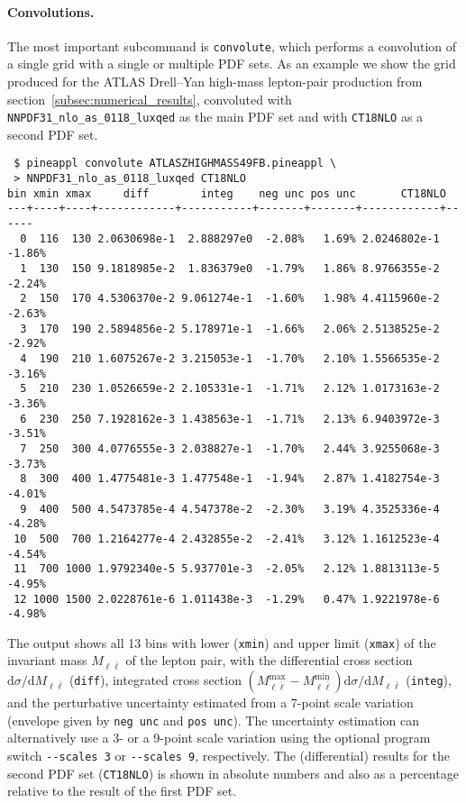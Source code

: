 \paragraph{Convolutions.}
The most important subcommand is \texttt{convolute}, which performs a convolution of a single grid with a single or multiple PDF sets.
As an example we show the grid produced for the ATLAS Drell--Yan high-mass lepton-pair production from section~\ref{subsec:numerical_results}, convoluted with \texttt{NNPDF31\_nlo\_as\_0118\_luxqed} as the main PDF set and with \texttt{CT18NLO} as a second PDF set.
\begin{verbatim}
 $ pineappl convolute ATLASZHIGHMASS49FB.pineappl \
 > NNPDF31_nlo_as_0118_luxqed CT18NLO
bin xmin xmax     diff        integ    neg unc pos unc       CT18NLO
---+----+----+------------+-----------+-------+-------+------------+------
  0  116  130 2.0630698e-1  2.888297e0  -2.08%   1.69% 2.0246802e-1 -1.86%
  1  130  150 9.1818985e-2  1.836379e0  -1.79%   1.86% 8.9766355e-2 -2.24%
  2  150  170 4.5306370e-2 9.061274e-1  -1.60%   1.98% 4.4115960e-2 -2.63%
  3  170  190 2.5894856e-2 5.178971e-1  -1.66%   2.06% 2.5138525e-2 -2.92%
  4  190  210 1.6075267e-2 3.215053e-1  -1.70%   2.10% 1.5566535e-2 -3.16%
  5  210  230 1.0526659e-2 2.105331e-1  -1.71%   2.12% 1.0173163e-2 -3.36%
  6  230  250 7.1928162e-3 1.438563e-1  -1.71%   2.13% 6.9403972e-3 -3.51%
  7  250  300 4.0776555e-3 2.038827e-1  -1.70%   2.44% 3.9255068e-3 -3.73%
  8  300  400 1.4775481e-3 1.477548e-1  -1.94%   2.87% 1.4182754e-3 -4.01%
  9  400  500 4.5473785e-4 4.547378e-2  -2.30%   3.19% 4.3525336e-4 -4.28%
 10  500  700 1.2164277e-4 2.432855e-2  -2.41%   3.12% 1.1612523e-4 -4.54%
 11  700 1000 1.9792340e-5 5.937701e-3  -2.05%   2.12% 1.8813113e-5 -4.95%
 12 1000 1500 2.0228761e-6 1.011438e-3  -1.29%   0.47% 1.9221978e-6 -4.98%
\end{verbatim}
The output shows all 13 bins with lower (\texttt{xmin}) and upper limit (\texttt{xmax}) of the invariant mass $M_{\ell \bar{\ell}}$ of the lepton pair, with the differential cross section $\mathrm{d} \sigma / \mathrm{d} M_{\ell \bar{\ell}}$ (\texttt{diff}), integrated cross section $(M_{\ell \bar{\ell}}^\mathrm{max} - M_{\ell \bar{\ell}}^\mathrm{min}) \mathrm{d} \sigma / \mathrm{d} M_{\ell \bar{\ell}}$ (\texttt{integ}), and the perturbative uncertainty estimated from a 7-point scale variation (envelope given by \texttt{neg unc} and \texttt{pos unc}).
The uncertainty estimation can alternatively use a 3- or a 9-point scale variation using the optional program switch \texttt{-{}-scales 3} or \texttt{-{}-scales 9}, respectively.
The (differential) results for the second PDF set (\texttt{CT18NLO}) is shown in absolute numbers and also as a percentage relative to the result of the first PDF set.

